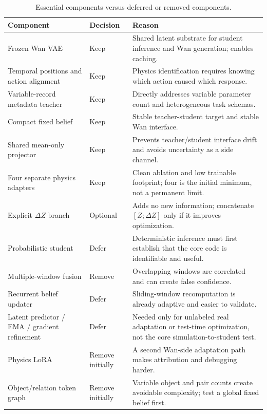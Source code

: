 \documentclass[11pt]{article}
\begin{document}
\begin{table}[H]
\centering
\small
\caption{Essential components versus deferred or removed components.}
\begin{tabularx}{\textwidth}{L{0.22\textwidth} C{0.12\textwidth} Y}
\toprule
Component & Decision & Reason \\
\midrule
Frozen Wan VAE & Keep & Shared latent substrate for student inference and Wan generation; enables caching. \\
Temporal positions and action alignment & Keep & Physics identification requires knowing which action caused which response. \\
Variable-record metadata teacher & Keep & Directly addresses variable parameter count and heterogeneous task schemas. \\
Compact fixed belief & Keep & Stable teacher-student target and stable Wan interface. \\
Shared mean-only projector & Keep & Prevents teacher/student interface drift and avoids uncertainty as a side channel. \\
Four separate physics adapters & Keep & Clean ablation and low trainable footprint; four is the initial minimum, not a permanent limit. \\
Explicit $\Delta Z$ branch & Optional & Adds no new information; concatenate $[Z;\Delta Z]$ only if it improves optimization. \\
Probabilistic student & Defer & Deterministic inference must first establish that the core code is identifiable and useful. \\
Multiple-window fusion & Remove & Overlapping windows are correlated and can create false confidence. \\
Recurrent belief updater & Defer & Sliding-window recomputation is already adaptive and easier to validate. \\
Latent predictor / EMA / gradient refinement & Defer & Needed only for unlabeled real adaptation or test-time optimization, not the core simulation-to-student test. \\
Physics LoRA & Remove initially & A second Wan-side adaptation path makes attribution and debugging harder. \\
Object/relation token graph & Remove initially & Variable object and pair counts create avoidable complexity; test a global fixed belief first. \\
\bottomrule
\end{tabularx}
\end{table}
\end{document}
